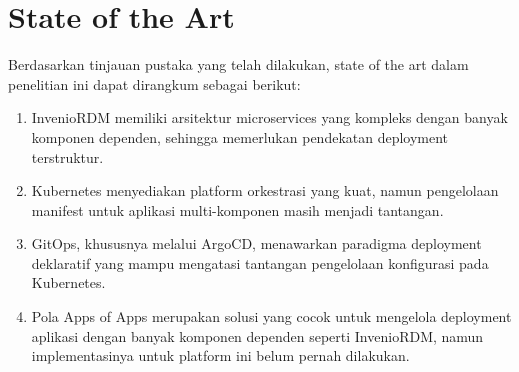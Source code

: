\section{State of the Art}

Berdasarkan tinjauan pustaka yang telah dilakukan, state of the art dalam penelitian ini dapat dirangkum sebagai berikut:

\begin{enumerate}
  \item InvenioRDM memiliki arsitektur microservices yang kompleks dengan banyak komponen dependen, sehingga memerlukan pendekatan deployment terstruktur.
  \item Kubernetes menyediakan platform orkestrasi yang kuat, namun pengelolaan manifest untuk aplikasi multi-komponen masih menjadi tantangan.
  \item GitOps, khususnya melalui ArgoCD, menawarkan paradigma deployment deklaratif yang mampu mengatasi tantangan pengelolaan konfigurasi pada Kubernetes.
  \item Pola Apps of Apps merupakan solusi yang cocok untuk mengelola deployment aplikasi dengan banyak komponen dependen seperti InvenioRDM, namun implementasinya untuk platform ini belum pernah dilakukan.
\end{enumerate}
